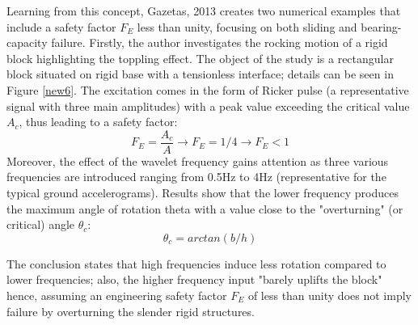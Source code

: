 \documentclass[11pt,a4paper]{report}
\begin{document}
 Learning from this concept, Gazetas, 2013 \cite{gazetas2013can} creates two numerical examples that include a safety factor $F_E$ less than unity, focusing on both sliding and bearing-capacity failure.
Firstly, the author investigates the rocking motion of a rigid block highlighting the toppling effect. The object of the study is a rectangular block situated on rigid base with a tensionless interface; details can be seen in Figure \ref{new6}. The excitation comes in the form of Ricker pulse (a representative signal with three main amplitudes) with a peak value exceeding the critical value $A_c$, thus leading to a safety factor:
 \begin{equation}
 F_E= \frac{A_c}{A} \longrightarrow F_E=1/4 \longrightarrow F_E<1
 \end{equation}
 Moreover, the effect of the wavelet frequency gains attention as three various frequencies are introduced ranging from 0.5Hz to 4Hz (representative for the typical ground accelerograms). Results show that the lower frequency produces the maximum angle of rotation \gls{theta} with a value close to the "overturning" (or critical) angle $\theta_c$:
 \begin{equation}
 	\theta_c=arctan(b/h)
 \end{equation}
 
 The conclusion states that high frequencies induce less rotation compared to lower frequencies; also, the higher frequency input "barely uplifts the block" hence, assuming an engineering safety factor $F_E$ of less than unity does not imply failure by overturning the slender rigid structures.
  
\end{document}
